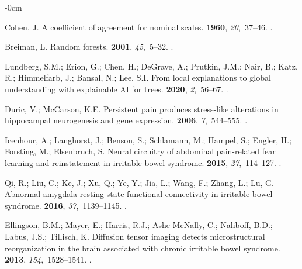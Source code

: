 \documentclass[diagnostics,article,accept,pdftex,moreauthors]{Definitions/mdpi}
\begin{document}
\begin{adjustwidth}{-\extralength}{0cm}
\begin{thebibliography}{999}
Cohen, J.
\newblock A coefficient of agreement for nominal scales.
 {\bf 1960}, {\em
  20},~37--46.
.

Breiman, L.
\newblock Random forests.
 {\bf 2001}, {\em 45},~5--32.
.

Lundberg, S.M.; Erion, G.; Chen, H.; DeGrave, A.; Prutkin, J.M.; Nair, B.;
  Katz, R.; Himmelfarb, J.; Bansal, N.; Lee, S.I.
\newblock From local explanations to global understanding with explainable AI
  for trees.
 {\bf 2020}, {\em 2},~56--67.
.

Duric, V.; McCarson, K.E.
\newblock Persistent pain produces stress-like alterations in hippocampal
  neurogenesis and gene expression.
 {\bf 2006}, {\em 7},~544--555.
.

Icenhour, A.; Langhorst, J.; Benson, S.; Schlamann, M.; Hampel, S.; Engler, H.;
  Forsting, M.; Elsenbruch, S.
\newblock Neural circuitry of abdominal pain-related fear learning and
  reinstatement in irritable bowel syndrome.
 {\bf 2015}, {\em
  27},~114--127.
.

Qi, R.; Liu, C.; Ke, J.; Xu, Q.; Ye, Y.; Jia, L.; Wang, F.; Zhang, L.; Lu, G.
\newblock Abnormal amygdala resting-state functional connectivity in irritable
  bowel syndrome.
 {\bf 2016}, {\em
  37},~1139--1145.
.

Ellingson, B.M.; Mayer, E.; Harris, R.J.; Ashe-McNally, C.; Naliboff, B.D.;
  Labus, J.S.; Tillisch, K.
\newblock Diffusion tensor imaging detects microstructural reorganization in
  the brain associated with chronic irritable bowel syndrome.
 {\bf 2013}, {\em 154},~1528--1541.
.


\end{thebibliography}
\end{adjustwidth}
\end{document}

